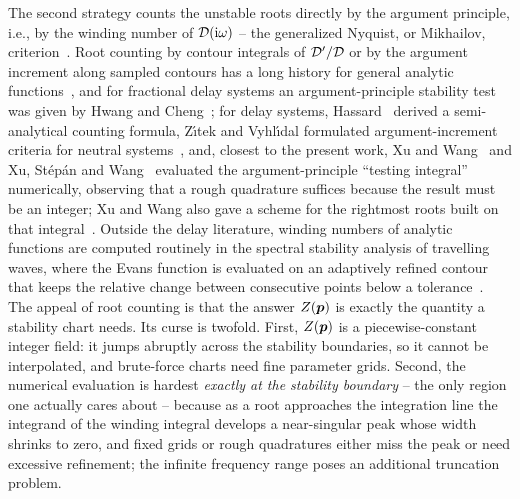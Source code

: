 The second strategy counts the unstable roots directly by the argument
principle, i.e., by the winding number of $\mathcal{D}(\mathrm{i}\omega)$ -- the
generalized Nyquist, or Mikhailov, criterion~\cite{stepan1989retarded,kolmanovskii1999introduction}.
Root counting by contour integrals of $\mathcal{D}'/\mathcal{D}$ or by the argument
increment along sampled contours has a long history for general analytic
functions~\cite{delves1967numerical,ying1988reliable,kravanja2000computing,kravanja2000zeal,johnson2009enclosing},
and for fractional delay systems an argument-principle stability test was
given by Hwang and Cheng~\cite{hwang2006numerical};
for delay systems, Hassard~\cite{hassard1997counting} derived a
semi-analytical counting formula, Z\'{\i}tek and Vyhl\'{\i}dal formulated
argument-increment criteria for neutral systems~\cite{zitek2008argument,vyhlidal2009modification},
and, closest to the present work, Xu and Wang~\cite{xu2014exact} and Xu,
St\'ep\'an and Wang~\cite{xu2016delay} evaluated the argument-principle
``testing integral'' numerically, observing that a rough quadrature suffices
because the result must be an integer; Xu and Wang also gave a scheme for the
rightmost roots built on that integral~\cite{xu2014exact}.
Outside the delay literature, winding numbers of analytic functions are
computed routinely in the spectral stability analysis of travelling waves,
where the Evans function is evaluated on an adaptively refined contour that
keeps the relative change between consecutive points below a
tolerance~\cite{barker2018computing,barker2015stablab}. The appeal of root counting is that
the answer $Z(\boldsymbol{p})$ is exactly the quantity a stability chart needs.
Its curse is twofold. First, $Z(\boldsymbol{p})$ is a piecewise-constant integer
field: it jumps abruptly across the stability boundaries, so it cannot be
interpolated, and brute-force charts need fine parameter grids. Second, the
numerical evaluation is hardest \emph{exactly at the stability boundary} --
the only region one actually cares about -- because as a root approaches the
integration line the integrand of the winding integral develops a
near-singular peak whose width shrinks to zero, and fixed grids or rough
quadratures either miss the peak or need excessive refinement; the infinite
frequency range poses an additional truncation problem.

